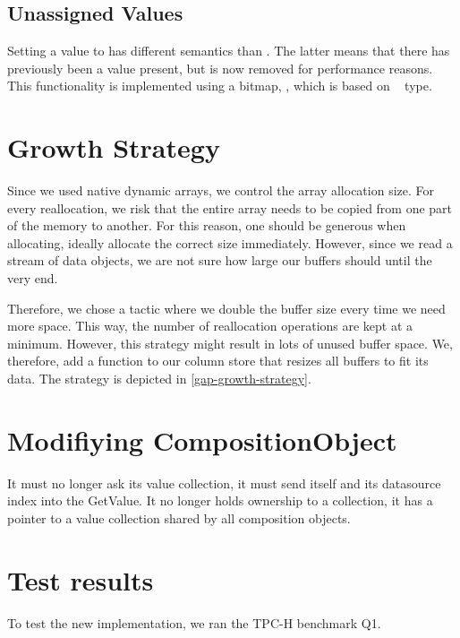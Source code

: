 \subsection{Unassigned Values}
\label{sub:Unassigned Values}
Setting a value to  has different semantics than . The latter means that there has previously been a value present, but is now removed for performance reasons. This functionality is implemented using a bitmap, , which is based on \delphi~ type.

\section{Growth Strategy}
\label{sec:Growth Strategy}
Since we used native dynamic arrays, we control the array allocation size. For every reallocation, we risk that the entire array needs to be copied from one part of the memory to another. For this reason, one should be generous when allocating, ideally allocate the correct size immediately. However, since we read a stream of data objects, we are not sure how large our buffers should until the very end. 

Therefore, we chose a tactic where we double the buffer size every time we need more space. This way, the number of reallocation operations are kept at a minimum. However, this strategy might result in lots of unused buffer space. We, therefore, add a  function to our column store that resizes all buffers to fit its data. The strategy is depicted in \ref{gap-growth-strategy}.

\section{Modifiying CompositionObject}
\label{sec:Modifiying CompositionObject}
It must no longer ask its value collection, it must send itself and its datasource index into the GetValue. It no longer holds ownership to a collection, it has a pointer to a value collection shared by all composition objects.

\section{Test results}
\label{sec:Test results}
To test the new implementation, we ran the TPC-H benchmark Q1. 

